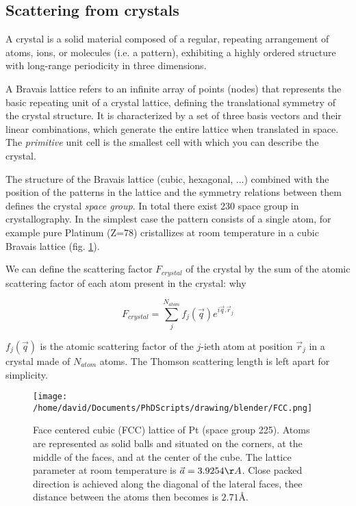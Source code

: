 \subsection{Scattering from crystals}

A crystal is a solid material composed of a regular, repeating arrangement of atoms, ions, or molecules (i.e. a pattern), exhibiting a highly ordered structure with long-range periodicity in three dimensions.

A Bravais lattice refers to an infinite array of points (nodes) that represents the basic repeating unit of a crystal lattice, defining the translational symmetry of the crystal structure.
It is characterized by a set of three basis vectors and their linear combinations, which generate the entire lattice when translated in space.
The \textit{primitive} unit cell is the smallest cell with which you can describe the crystal.

The structure of the Bravais lattice (cubic, hexagonal, ...) combined with the position of the patterns in the lattice and the symmetry relations between them defines the crystal \textit{space group}.
In total there exist 230 space group in crystallography.
In the simplest case the pattern consists of a single atom, for example pure Platinum (Z=78) cristallizes at room temperature in a cubic Bravais lattice (fig. \ref{fig:fcc}).

We can define the scattering factor $F_{crystal}$ of the crystal by the sum of the atomic scattering factor of each atom present in the crystal: \textcolor{Important}{why}

\begin{equation}
    F_{crystal} = \sum_j^{N_{atom}} f_j(\vec{q}) e^{i\vec{q}.\vec{r}_j}
\end{equation}

$f_j(\vec{q})$ is the atomic scattering factor of the $j$-ieth atom at position $\vec{r}_j$ in a crystal made of $N_{atom}$ atoms.
The Thomson scattering length is left apart for simplicity.

\begin{figure}[!htb]
    \centering
    \texttt{[image: /home/david/Documents/PhDScripts/drawing/blender/FCC.png]}
    \caption{Face centered cubic (FCC) lattice of Pt (space group 225). Atoms are represented as solid balls and situated on the corners, at the middle of the faces, and at the center of the cube. The lattice parameter at room temperature is $\vec{a} = 3.9254 \AA$. Close packed direction is achieved along the diagonal of the lateral faces, thee distance between the atoms then becomes is $2.71 \si{\angstrom}.$}
    \label{fig:fcc}
\end{figure}

